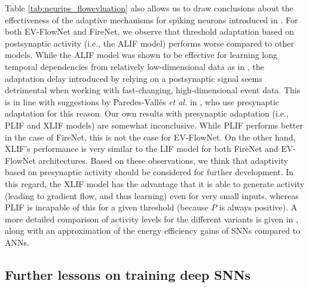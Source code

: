 Table \ref{tab:neurips_flowevluation} also allows us to draw conclusions about the effectiveness of the adaptive mechanisms for spiking neurons introduced in . For both EV-FlowNet and FireNet, we observe that threshold adaptation based on postsynaptic activity (i.e., the ALIF model) performs worse compared to other models. While the ALIF model was shown to be effective for learning long temporal dependencies from relatively low-dimensional data as in \cite{bellec2018long,bellec2020solution,yin2021accurate}, the adaptation delay introduced by relying on a postsynaptic signal seems detrimental when working with fast-changing, high-dimensional event data. This is in line with suggestions by Paredes-Vall\'es \textit{et al.} in \cite{paredes-valles2020unsupervised}, who use presynaptic adaptation for this reason. Our own results with presynaptic adaptation (i.e., PLIF and XLIF models) are somewhat inconclusive. While PLIF performs better in the case of FireNet, this is not the case for EV-FlowNet. On the other hand, XLIF's performance is very similar to the LIF model for both FireNet and EV-FlowNet architectures. Based on these observations, we think that adaptivity based on presynaptic activity should be considered for further development. In this regard, the XLIF model has the advantage that it is able to generate activity (leading to gradient flow, and thus learning) even for very small inputs, whereas PLIF is incapable of this for a given threshold (because $P$ is always positive). A more detailed comparison of activity levels for the different variants is given in , along with an approximation of the energy efficiency gains of SNNs compared to ANNs.

\subsection*{Further lessons on training deep SNNs}\label{sec:neurips_lessons}

